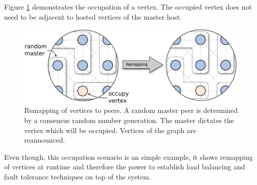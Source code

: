 Figure \ref{fig:gol_remapping} demonstrates the occupation of a
vertex.  The occupied vertex does not need to be adjacent to hosted
vertices of the master host.

  \begin{figure}[H]
    \centering
    \includegraphics[width=\textwidth]{graphics/40_gol_remapping}
    \caption{Remapping of vertices to peers. A random master peer is
      determined by a consensus random number generation. The master
      dictates the vertex which will be occupied. Vertices of the
      graph are reannounced.}
    \label{fig:gol_remapping}
  \end{figure}

\noindent Even though, this occupation scenario is an simple example, it
shows remapping of vertices at runtime and therefore the power
to establish load balancing and fault tolerance techniques on
top of the system.

\cleardoublepage

